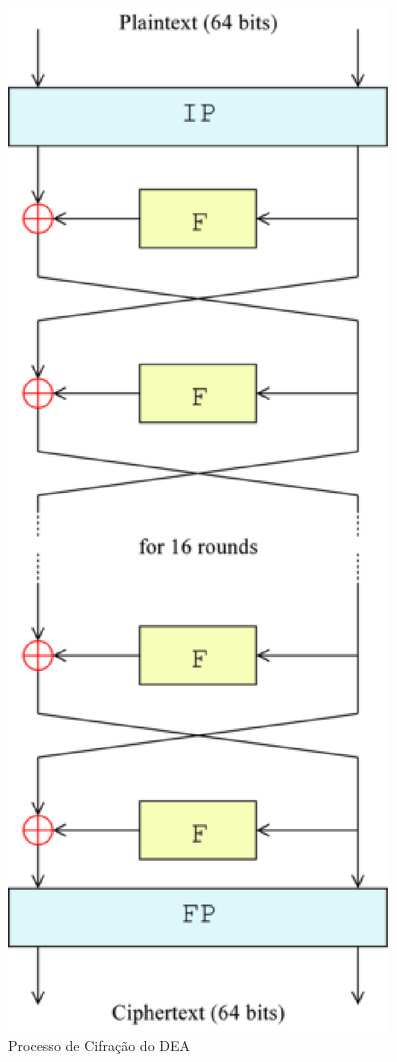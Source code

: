 	\begin{figure}[!ht]
		\centering
		\includegraphics[keepaspectratio=true,scale=0.3]{figuras/DES.eps}
		\caption{Processo de Cifração do DEA \cite{DEA}}
		\label{fig:img05}
	\end{figure}
	
